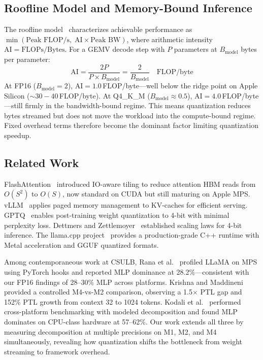\documentclass[conference]{IEEEtran}
\begin{document}
\subsection{Roofline Model and Memory-Bound Inference}

The roofline model~\cite{williams2009} characterizes achievable performance as $\min(\text{Peak FLOP/s},\; \text{AI} \times \text{Peak BW})$, where arithmetic intensity $\text{AI} = \text{FLOPs} / \text{Bytes}$. For a GEMV decode step with $P$ parameters at $B_{\text{model}}$ bytes per parameter:
\begin{equation}
  \text{AI} = \frac{2P}{P \times B_{\text{model}}} = \frac{2}{B_{\text{model}}} \quad \text{FLOP/byte}
  \label{eq:ai}
\end{equation}
At FP16 ($B_{\text{model}}{=}2$), $\text{AI}{=}1.0$\,FLOP/byte---well below the ridge point on Apple Silicon (${\sim}30{-}40$\,FLOP/byte). At Q4\_K\_M ($B_{\text{model}}{\approx}0.5$), $\text{AI}{=}4.0$\,FLOP/byte---still firmly in the bandwidth-bound regime. This means quantization reduces bytes streamed but does not move the workload into the compute-bound regime. Fixed overhead terms therefore become the dominant factor limiting quantization speedup.

\subsection{Related Work}

FlashAttention~\cite{dao2022,dao2023} introduced IO-aware tiling to reduce attention HBM reads from $O(S^2)$ to $O(S)$, now standard on CUDA but still maturing on Apple MPS. vLLM~\cite{kwon2023} applies paged memory management to KV-caches for efficient serving. GPTQ~\cite{frantar2022} enables post-training weight quantization to 4-bit with minimal perplexity loss. Dettmers and Zettlemoyer~\cite{dettmers2023} established scaling laws for 4-bit inference. The llama.cpp project~\cite{gerganov2023} provides a production-grade C++ runtime with Metal acceleration and GGUF quantized formats.

Among contemporaneous work at CSULB, Rana et al.~\cite{rana2025} profiled LLaMA on MPS using PyTorch hooks and reported MLP dominance at 28.2\%---consistent with our FP16 findings of 28--30\% MLP across platforms. Krishna and Maddineni~\cite{krishna2025} provided a controlled M4-vs-M2 comparison, observing a 1.5$\times$ PTL gap and 152\% PTL growth from context 32 to 1024 tokens. Kodali et al.~\cite{kodali2025} performed cross-platform benchmarking with modeled decomposition and found MLP dominates on CPU-class hardware at 57--62\%. Our work extends all three by measuring decomposition at multiple precisions on M1, M2, and M4 simultaneously, revealing how quantization shifts the bottleneck from weight streaming to framework overhead.
\end{document}
